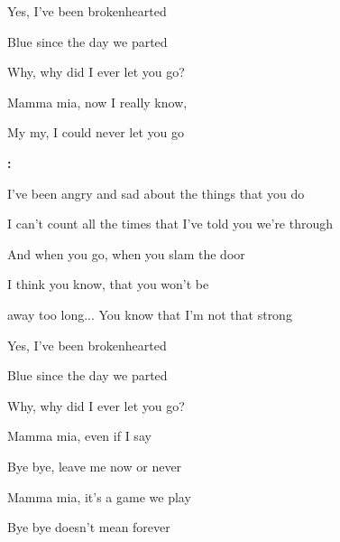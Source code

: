 \begin{song}
\smallskip

\begin{chorusbox}{\Bridge}
Yes, I've been brokenhearted \par
{}Blue since the day we parted \par
{} Why, why did I ever let you go? \par
{} Mamma mia,  now I really know, \par
{} My my, I could never let you go \par
\end{chorusbox}

\bigskip

\Instrumental\textbf{:}     \par

\bigskip

I've been angry and sad about the things that you do \par
{}I can't count all the times that I've told you we're through \par
{}And when you go,  when you slam the door \par
{}I think you know,  that you won't be \par
away too long... You know that I'm not that strong  \par

\bigskip

\PrechorusAndChorus

\bigskip

Yes, I've been brokenhearted \par
{}Blue since the day we parted \par
{} Why, why did I ever let you go? \par

\bigskip

Mamma mia, even if I say \par
{} Bye bye, leave me now or never \par
{}Mamma mia, it's a game we play \par
{} Bye bye doesn't mean forever \par


\end{song}
